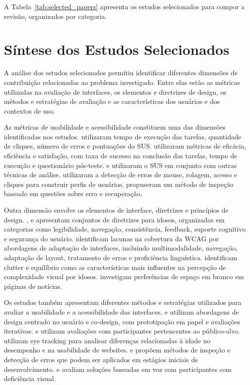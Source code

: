 A Tabela~\ref{tab:selected_papers} apresenta os estudos selecionados para compor a revisão, organizados por categoria.




\section{Síntese dos Estudos Selecionados}

A análise dos estudos selecionados permitiu identificar diferentes dimensões de contribuição relacionadas ao problema investigado. Entre elas estão as métricas utilizadas na avaliação de interfaces, os elementos e diretrizes de design, os métodos e estratégias de avaliação e as características dos usuários e dos contextos de uso.

As métricas de usabilidade e acessibilidade constituem uma das dimensões identificadas nos estudos. \cite{weighted_heuristic} utilizaram tempo de execução das tarefas, quantidade de cliques, número de erros e pontuações do SUS. \cite{gatsou2017seniors} utilizaram métricas de eficácia, eficiência e satisfação, com taxa de sucesso na conclusão das tarefas, tempo de execução e questionário pós-teste. \cite{allah2021empathy} e \cite{weighted_heuristic} utilizaram o SUS em conjunto com outras técnicas de análise. \cite{taylor2009using} utilizaram a detecção de erros de mouse, rolagem, acesso e cliques para construir perfis de usuários. \cite{filgueiras2009recoverability} propuseram um método de inspeção baseado em questões sobre erro e recuperação.

Outra dimensão envolve os elementos de interface, diretrizes e princípios de design. \cite{kurniawan2005research}, \cite{sun2010preliminary} e \cite{dombrovskaia2021guideline} apresentam conjuntos de diretrizes para idosos, organizadas em categorias como legibilidade, navegação, consistência, feedback, suporte cognitivo e segurança do usuário. \cite{wickramathilaka2023addressing} identificam lacunas na cobertura da WCAG por abordagens de adaptação de interfaces, incluindo multimodalidade, navegação, adaptação de layout, tratamento de erros e proficiência linguística. \cite{sadeghi2020hci} identificam clutter e equilíbrio como as características mais influentes na percepção de complexidade visual por idosos. \cite{ko2019old} investigam preferências de espaço em branco em páginas de notícias.

Os estudos também apresentam diferentes métodos e estratégias utilizados para avaliar a usabilidade e a acessibilidade das interfaces. \cite{balakrishnan2012user} e \cite{kymäläinen2012creating} utilizam abordagens de design centrado no usuário e co-design, com prototipação em papel e avaliações iterativas. \cite{breaking_barriers} e \cite{ro2024usability} utilizam avaliações com participantes pertencentes ao público-alvo. \cite{romano2013age} utilizam eye tracking para analisar diferenças relacionadas à idade no desempenho e na usabilidade de websites. \cite{filgueiras2009recoverability} e \cite{taylor2009using} propõem métodos de inspeção e detecção de erros que podem ser aplicados em estágios iniciais de desenvolvimento. \cite{gonzalez2025augmenting} e \cite{ramineni2024enhancing} avaliam soluções baseadas em voz com participantes com deficiência visual.

